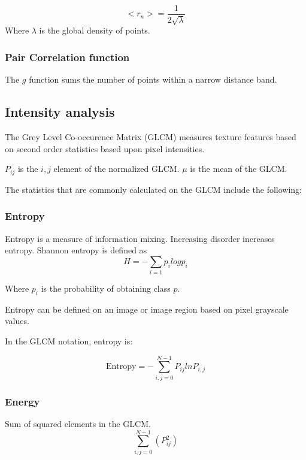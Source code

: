 \begin{equation}

\end{equation}

\begin{equation}
\label{eq:knn}
    <r_n> = \frac{1}{2\sqrt{\lambda}}
\end{equation}
Where $\lambda$ is the global density of points.

\subsubsection{Pair Correlation function}

The $g$ function sums the number of points within a narrow distance band.

\subsection{Intensity analysis}

The Grey Level Co-occurence Matrix (GLCM)\cite{GLCM} measures texture features based on second order statistics based upon pixel intensities.


$P_{ij}$ is the $i,j$ element of the normalized GLCM. $\mu$ is the mean of the GLCM.

The statistics that are commonly calculated on the GLCM\cite{haralick1973textural} include the following:

\subsubsection{Entropy}
Entropy is a measure of information mixing. Increasing disorder increases entropy. Shannon entropy is defined as \begin{equation}
    H = -\sum_{i=1} {p_i log p_i}
\end{equation}

Where $p_i$ is the probability of obtaining class $p$.

Entropy can be defined on an image or image region based on pixel grayscale values.

In the GLCM notation, entropy is:

\begin{equation}
    \mathrm{Entropy} = -\sum_{i,j=0}^{N-1} P_{ij} ln{P_{i,j}}
\end{equation}

\subsubsection{Energy}
Sum of squared elements in the GLCM. 
\begin{equation}
    \sum^{N-1}_{i,j=0}(P_{ij}^2)
\end{equation}


